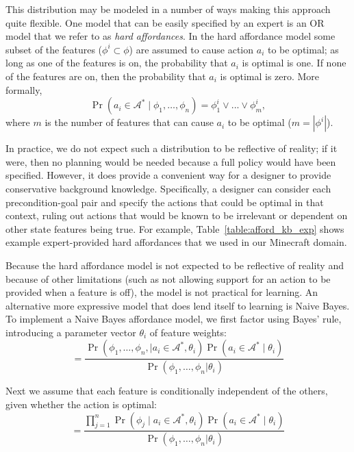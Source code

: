 \documentclass[letterpaper]{article}
\begin{document}
This distribution may be modeled in a number of ways making this
approach quite flexible. One model that can be easily specified by
an expert is an OR model that we refer to as {\em hard affordances}.
In the hard affordance model some subset of the features 
($\phi^i \subset \phi$) are
assumed to cause action $a_i$ to be optimal; as long as one of
the features is on, the probability that $a_i$ is optimal is one.
If none of the features are on, then the probability that $a_i$ is 
optimal is zero. More formally,
\begin{equation}
\Pr(a_i \in \mathcal{A}^*  \mid \phi_1, \ldots, \phi_n) = \phi_1^i \lor ... \lor \phi_m^i,
\end{equation}
where $m$ is the number of features that can cause $a_i$ to be optimal ($m = |\phi^i|$).

In practice, we do not expect such a distribution to be reflective of
reality; if it were, then no planning would be needed because a full
policy would have been specified. However, it does provide a
convenient way for a designer to provide conservative background
knowledge. Specifically, a designer can consider each precondition-goal
pair and specify the actions that could be optimal in that context, ruling
out actions that would be known to be irrelevant or dependent on other
state features being true. For example,
Table~\ref{table:afford_kb_exp} shows example expert-provided
hard affordances that we used in our Minecraft domain.

Because the hard affordance model is not expected to be
reflective of reality and because of other limitations (such as
not allowing support for an action to be provided when
a feature is off), the model is not practical for 
learning. An alternative more expressive model
that does lend itself to learning is Naive Bayes. 
To implement a Naive Bayes affordance model, we first factor using Bayes' rule,
introducing a parameter vector $\theta_i$ of feature weights:
\begin{equation}
= \frac{\Pr(\phi_1, \ldots, \phi_{n}, \mid a_i \in \mathcal{A}^*, \theta_i) \Pr(a_i \in \mathcal{A}^* \mid \theta_i)}{\Pr(\phi_1, \ldots, \phi_{n} | \theta_i)}
\label{eq:bayes}
\end{equation}

Next we assume that each feature is conditionally independent of the others, given whether the action is optimal:
\begin{equation}
= \frac{\prod_{j=1}^{n} \Pr(\phi_j \mid a_i \in \mathcal{A}^*, \theta_i) \Pr(a_i \in \mathcal{A}^* \mid \theta_i) }{\Pr(\phi_1, \ldots, \phi_{n} | \theta_i)}
\label{eq:final}
\end{equation}
\end{document}
